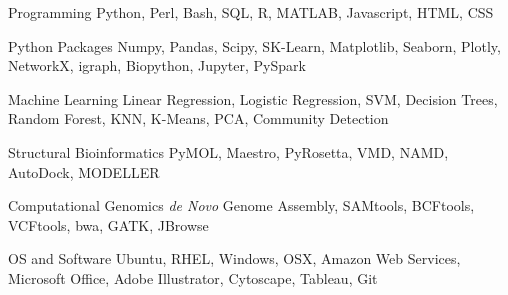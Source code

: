 \vspace{2mm}

\begin{cvskills}

  \cvskill
    {Programming} %
    {Python, Perl, Bash, SQL, R, MATLAB, Javascript, HTML, CSS} %

  \cvskill
    {Python Packages} %
    {Numpy, Pandas, Scipy, SK-Learn, Matplotlib, Seaborn, Plotly, NetworkX, igraph, Biopython, Jupyter, PySpark} %
    
  \cvskill
    {Machine Learning} %
    {Linear Regression, Logistic Regression, SVM, Decision Trees, Random Forest, KNN, K-Means, PCA, Community Detection} %
    
  \cvskill
    {Structural Bioinformatics} %
    {PyMOL, Maestro, PyRosetta, VMD, NAMD, AutoDock, MODELLER} %

  \cvskill
    {Computational Genomics} %
    {\textit{de Novo} Genome Assembly, SAMtools, BCFtools, VCFtools, bwa, GATK, JBrowse} %

  \cvskill
    {OS and Software} %
    {Ubuntu, RHEL, Windows, OSX, Amazon Web Services, Microsoft Office, Adobe Illustrator, Cytoscape, Tableau, Git} %
    
\vspace{-8.0mm}
\end{cvskills}